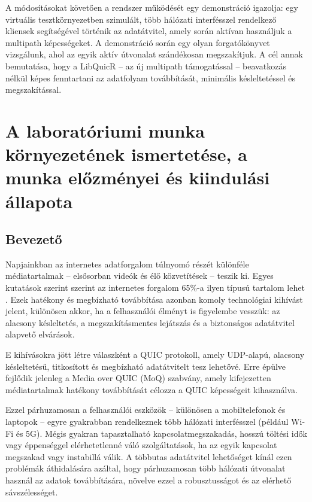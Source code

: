 \documentclass[a4paper,oneside]{article}
\begin{document}
\begin{titlepage}
{  A módosításokat követően a rendszer működését egy demonstráció
  igazolja: egy virtuális tesztkörnyezetben szimulált, több hálózati 
  interfésszel rendelkező kliensek segítségével történik az adatátvitel, 
  amely során aktívan használjuk a multipath képességeket. A demonstráció 
  során egy olyan forgatókönyvet vizsgálunk, ahol az egyik aktív 
  útvonalat szándékosan megszakítjuk. 
  A cél annak bemutatása, hogy a LibQuicR – az új multipath támogatással – 
  beavatkozás nélkül képes fenntartani az adatfolyam 
  továbbítását, minimális késleltetéssel és megszakítással.}

 
  
 
\end{titlepage} 

\section{A laboratóriumi munka környezetének ismertetése,
     a munka előzményei és kiindulási állapota}
\label{sec:kornyezet}
\subsection{Bevezető}
\label{sec:bevezeto}
Napjainkban az internetes adatforgalom túlnyomó részét különféle médiatartalmak – 
elsősorban videók és élő közvetítések – teszik ki. Egyes kutatások szerint 
szerint az internetes forgalom 65\%-a ilyen típusú tartalom lehet \cite{live_stats}. 
Ezek hatékony és megbízható továbbítása azonban komoly 
technológiai kihívást jelent, különösen akkor, ha a felhasználói élményt is 
figyelembe vesszük: az alacsony késleltetés, a megszakításmentes lejátszás 
és a biztonságos adatátvitel alapvető elvárások.

E kihívásokra jött létre válaszként a QUIC protokoll, amely UDP-alapú, alacsony 
késleltetésű, titkosított és megbízható adatátvitelt tesz lehetővé. Erre épülve 
fejlődik jelenleg a Media over QUIC (MoQ) szabvány, amely kifejezetten 
médiatartalmak hatékony továbbítását célozza a QUIC képességeit kihasználva.

Ezzel párhuzamosan a felhasználói eszközök – különösen a mobiltelefonok és 
laptopok – egyre gyakrabban rendelkeznek több hálózati interfésszel (például Wi-Fi és 5G). 
Mégis gyakran tapasztalható kapcsolatmegszakadás, hosszú töltési idők vagy éppenséggel 
elérhetetlenné váló szolgáltatások, ha az egyik kapcsolat megszakad vagy instabillá 
válik. A többutas adatátvitel lehetőséget kínál ezen problémák áthidalására azáltal, 
hogy párhuzamosan több hálózati útvonalat használ az adatok továbbítására, növelve 
ezzel a robusztusságot és az elérhető sávszélességet.
\end{document}
